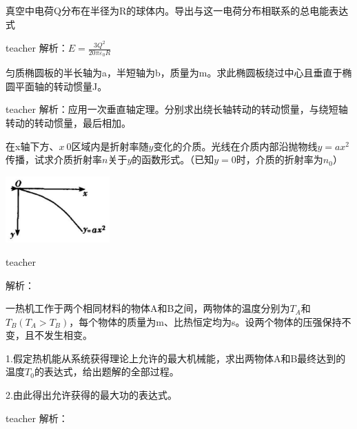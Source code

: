 \begin{example}
	真空中电荷Q分布在半径为R的球体内。导出与这一电荷分布相联系的总电能表达式

\begin{taggedblock}{teacher}
解析：$E=\frac{3Q^2}{20\pi \varepsilon_0 R}$
\end{taggedblock}
\end{example}

\begin{example}
	匀质椭圆板的半长轴为a，半短轴为b，质量为m。求此椭圆板绕过中心且垂直于椭圆平面轴的转动惯量J。

\begin{taggedblock}{teacher}
解析：应用一次垂直轴定理。分别求出绕长轴转动的转动惯量，与绕短轴转动的转动惯量，最后相加。
\end{taggedblock}
\end{example}


\begin{example}
	在x轴下方、$x\>0$区域内是折射率随$y$变化的介质。光线在介质内部沿抛物线$y=ax^2$传播，试求介质折射率$n$关于$y$的函数形式。（已知$y=0$时，介质的折射率为$n_0$）

\begin{flushright}
\includegraphics[width = 0.3\textwidth]{images/smallAna-14.pdf} 
\end{flushright}
\begin{taggedblock}{teacher}

解析：
\end{taggedblock}
\end{example}


\begin{example}
	一热机工作于两个相同材料的物体A和B之间，两物体的温度分别为$T_A$和$T_B(T_A>T_B)$，每个物体的质量为m、比热恒定均为s。设两个物体的压强保持不变，且不发生相变。
	
	1.假定热机能从系统获得理论上允许的最大机械能，求出两物体A和B最终达到的温度$T_0$的表达式，给出题解的全部过程。
	
	2.由此得出允许获得的最大功的表达式。

\begin{taggedblock}{teacher}
解析：
\end{taggedblock}
\end{example}


